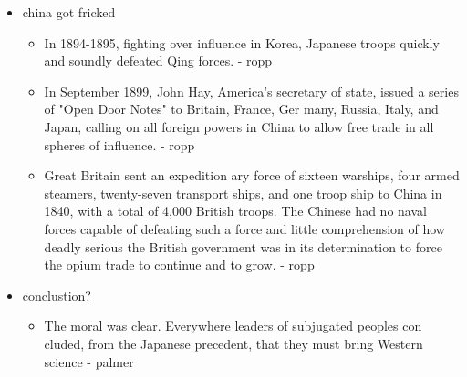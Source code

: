 \documentclass[letterpaper]{article}
\begin{document}
\begin{itemize}
\item china got fricked

\begin{itemize}
\item In 1894-1895, fighting over influence in Korea, Japanese troops
quickly and soundly defeated Qing forces. - ropp
\item In September 1899, John Hay, America's secretary of state, issued a
series of "Open Door Notes" to Britain, France, Ger many, Russia,
Italy, and Japan, calling on all foreign powers in China to allow
free trade in all spheres of influence. - ropp
\item Great Britain sent an expedition ary force of sixteen warships, four
armed steamers, twenty-seven transport ships, and one troop ship to
China in 1840, with a total of 4,000 British troops. The Chinese had
no naval forces capable of defeating such a force and little
comprehension of how deadly serious the British government was in
its determination to force the opium trade to continue and to
grow. - ropp
\end{itemize}

\item conclustion?

\begin{itemize}
\item The moral was clear. Everywhere leaders of subjugated peoples con
cluded, from the Japanese precedent, that they must bring Western
science - palmer
\end{itemize}
\end{itemize}
\end{document}
